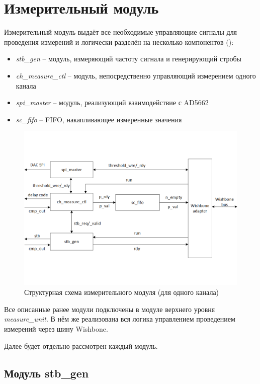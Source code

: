 \section{Измерительный модуль}

Измерительный модуль выдаёт все необходимые управляющие сигналы для проведения измерений и логически разделён на несколько компонентов ():

\begin{itemize}
	\item \emph{stb\_gen} -- модуль, измеряющий частоту сигнала и генерирующий стробы
	\item \emph{ch\_measure\_ctl} -- модуль, непосредственно управляющий измерением одного канала
	\item \emph{spi\_master} -- модуль, реализующий взаимодействие с AD5662
	\item \emph{sc\_fifo} -- FIFO, накапливающее измеренные значения
\end{itemize}

\begin{figure}[ht!] 
	\center
	\includegraphics [scale=0.7] {my_folder/images//mu_struct}
	\caption{Структурная схема измерительного модуля (для одного канала)} 
	\label{fig:mu-struct}  
\end{figure}

Все описанные ранее модули подключены в модуле верхнего уровня \emph{measure\_unit}. В нём же
реализована вся логика управлением проведением измерений через шину Wishbone.

Далее будет отдельно рассмотрен каждый модуль.

\subsection{Модуль stb\_gen}

